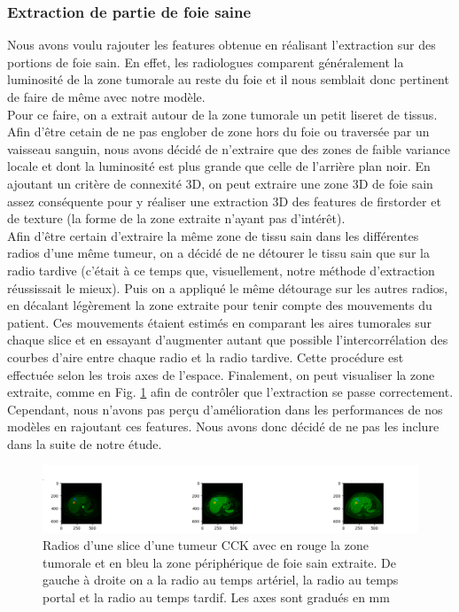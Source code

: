 \documentclass[10pt]{article}
\begin{document}
\subsubsection{Extraction de partie de foie saine}
Nous avons voulu rajouter les features obtenue en réalisant l'extraction sur des portions de foie sain. En effet, les radiologues comparent généralement la luminosité de la zone tumorale au reste du foie et il nous semblait donc pertinent de faire de même avec notre modèle.\\
\indent Pour ce faire, on a extrait autour de la zone tumorale un petit liseret de tissus. Afin d'être cetain de ne pas englober de zone hors du foie ou traversée par un vaisseau sanguin, nous avons décidé de n'extraire que des zones de faible variance locale et dont la luminosité est plus grande que celle de l'arrière plan noir. En ajoutant un critère de connexité 3D, on peut extraire une zone 3D de foie sain assez conséquente pour y réaliser une extraction 3D des features de firstorder et de texture (la forme de la zone extraite n'ayant pas d'intérêt).\\
\indent Afin d'être certain d'extraire la même zone de tissu sain dans les différentes radios d'une même tumeur, on a décidé de ne détourer le tissu sain que sur la radio tardive (c'était à ce temps que, visuellement, notre méthode d'extraction réussissait le mieux). Puis on a appliqué le même détourage sur les autres radios, en décalant légèrement la zone extraite pour tenir compte des mouvements du patient. Ces mouvements étaient estimés en comparant les aires tumorales sur chaque slice et en essayant d'augmenter autant que possible l'intercorrélation des courbes d'aire entre chaque radio et la radio tardive. Cette procédure est effectuée selon les trois axes de l'espace. Finalement, on peut visualiser la zone extraite, comme en Fig. \ref{fig:healthy_zone} afin de contrôler que l'extraction se passe correctement.\\
\indent Cependant, nous n'avons pas perçu d'amélioration dans les performances de nos modèles en rajoutant ces features. Nous avons donc décidé de ne pas les inclure dans la suite de notre étude.\\

\begin{figure}[tbp]
    \centering
    \includegraphics[scale = 0.3]{./images/sain.png}
    \caption{Radios d'une slice d'une tumeur CCK avec en rouge la zone tumorale et en bleu la zone périphérique de foie sain extraite. De gauche à droite on a la radio au temps artériel, la radio au temps portal et la radio au temps tardif. Les axes sont gradués en mm}
    \label{fig:healthy_zone}
\end{figure}
\end{document}
